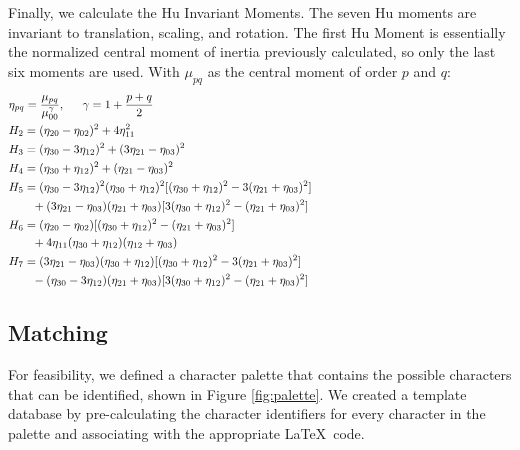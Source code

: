 \documentclass[journal]{IEEEtran}
\begin{document}
Finally, we calculate the Hu Invariant Moments\cite{Muralidharan:article_typical}. The seven Hu moments are invariant to translation, scaling, and rotation\cite{Hu:article_typical}. The first Hu Moment is essentially the normalized central moment of inertia previously calculated, so only the last six moments are used. With $\mu_{pq}$ as the central moment of order $p$ and $q$:
    \begin{equation} \label{eq:hu_moments}
    \begin{aligned}
    &\eta_{pq}=\frac{\mu_{pq}}{\mu_{00}^{\gamma}}, \hspace{15pt} \gamma=1+\frac{p+q}{2}\\
    & H_2=(\eta_{20}-\eta_{02})^2 +4\eta_{11}^2 \\    
    & H_3=(\eta_{30}-3\eta_{12})^2 +(3\eta_{21}-\eta_{03})^2 \\
    & H_4=(\eta_{30}+\eta_{12})^2 +(\eta_{21}-\eta_{03})^2 \\
    & H_5=(\eta_{30}-3\eta_{12})^2 (\eta_{30}+\eta_{12})^2[(\eta_{30}+\eta_{12})^2-3(\eta_{21}+\eta_{03})^2] \\
    & \text{\qquad}+(3\eta_{21}-\eta_{03})(\eta_{21}+\eta_{03})[3(\eta_{30}+\eta_{12})^2-(\eta_{21}+\eta_{03})^2] \\
    & H_6=(\eta_{20}-\eta_{02})[(\eta_{30}+\eta_{12})^2-(\eta_{21}+\eta_{03})^2] \\
    & \text{\qquad}+4\eta_{11}(\eta_{30}+\eta_{12})(\eta_{12}+\eta_{03}) \\
    & H_7=(3\eta_{21}-\eta_{03})(\eta_{30}+\eta_{12})[(\eta_{30}+\eta_{12})^2-3(\eta_{21}+\eta_{03})^2] \\
    & \text{\qquad}-(\eta_{30}-3\eta_{12})(\eta_{21}+\eta_{03})[3(\eta_{30}+\eta_{12})^2-(\eta_{21}+\eta_{03})^2]
    \end{aligned}
    \phantom{\hspace{6cm}}
    \end{equation}
\subsection{Matching}

For feasibility, we defined a character palette that contains the possible characters that can be identified, shown in Figure \ref{fig:palette}. We created a template database by pre-calculating the character identifiers for every character in the palette and associating with the appropriate \LaTeX\ code. 
\end{document}
